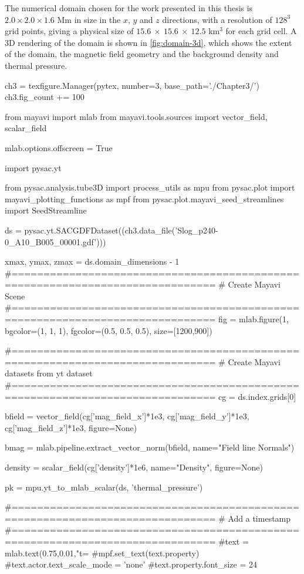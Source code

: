 The numerical domain chosen for the work presented in this thesis is $2.0 \times 2.0 \times 1.6$ Mm in size in the $x$, $y$ and $z$ directions, with a resolution of $128^3$ grid points, giving a physical size of $15.6\ \times\ 15.6\ \times\ 12.5$ km$^3$ for each grid cell.
A 3D rendering of the domain is shown in \cref{fig:domain-3d}, which shows the extent of the domain, the magnetic field geometry and the background density and thermal pressure.



\begin{pycode}[chapter3a]
ch3 = texfigure.Manager(pytex, number=3, base_path='./Chapter3/')
ch3.fig_count += 100

from mayavi import mlab
from mayavi.tools.sources import vector_field, scalar_field

mlab.options.offscreen = True

import pysac.yt

from pysac.analysis.tube3D import process_utils as mpu
from pysac.plot import mayavi_plotting_functions as mpf
from pysac.plot.mayavi_seed_streamlines import SeedStreamline

ds = pysac.yt.SACGDFDataset((ch3.data_file('Slog_p240-0_A10_B005_00001.gdf')))

xmax, ymax, zmax = ds.domain_dimensions - 1
#==============================================================================
# Create Mayavi Scene
#==============================================================================
fig = mlab.figure(1, bgcolor=(1, 1, 1), fgcolor=(0.5, 0.5, 0.5),
size=[1200,900])


#==============================================================================
# Create Mayavi datasets from yt dataset
#==============================================================================
cg = ds.index.grids[0]

bfield = vector_field(cg['mag_field_x']*1e3,
                      cg['mag_field_y']*1e3,
                      cg['mag_field_z']*1e3,
                      figure=None)

bmag = mlab.pipeline.extract_vector_norm(bfield, name="Field line Normals")

density = scalar_field(cg['density']*1e6, name="Density", figure=None)

pk = mpu.yt_to_mlab_scalar(ds, 'thermal_pressure')

#==============================================================================
# Add a timestamp
#==============================================================================
#text = mlab.text(0.75,0.01,"t=%
#mpf.set_text(text.property)
#text.actor.text_scale_mode = 'none'
#text.property.font_size = 24



\end{pycode}
